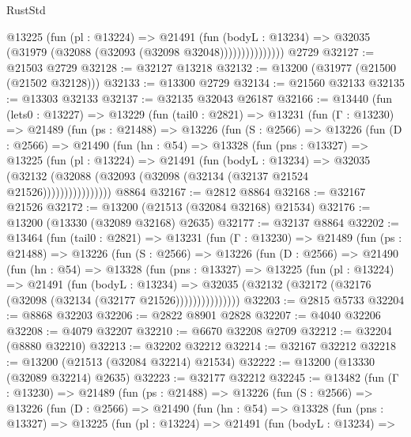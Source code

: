 \begin{lexlean}{RustStd}
\begin{coremodule}
                    @13225
                      (fun (pl : @13224) =>
                      @21491
                        (fun (bodyL : @13234) =>
                        @32035 (@31979 (@32088 (@32093 (@32098 @32048)))))))))))))))
    @2729
@32127 := @21503 @2729
@32128 := @32127 @13218
@32132 := @13200 (@31977 (@21500 (@21502 @32128)))
@32133 := @13300 @2729
@32134 := @21560 @32133
@32135 := @13303 @32133
@32137 := @32135 @32043 @26187
@32166 := @13440
    (fun (lets0 : @13227) =>
    @13229
      (fun (tail0 : @2821) =>
      @13231
        (fun (Γ : @13230) =>
        @21489
          (fun (ps : @21488) =>
          @13226
            (fun (S : @2566) =>
            @13226
              (fun (D : @2566) =>
              @21490
                (fun (hn : @54) =>
                @13328
                  (fun (pns : @13327) =>
                  @13225
                    (fun (pl : @13224) =>
                    @21491
                      (fun (bodyL : @13234) =>
                      @32035
                        (@32132
                          (@32088 (@32093 (@32098 (@32134 (@32137 @21524 @21526))))))))))))))))
    @8864
@32167 := @2812 @8864
@32168 := @32167 @21526
@32172 := @13200 (@21513 (@32084 @32168) @21534)
@32176 := @13200 (@13330 (@32089 @32168) @2635)
@32177 := @32137 @8864
@32202 := @13464
    (fun (tail0 : @2821) =>
    @13231
      (fun (Γ : @13230) =>
      @21489
        (fun (ps : @21488) =>
        @13226
          (fun (S : @2566) =>
          @13226
            (fun (D : @2566) =>
            @21490
              (fun (hn : @54) =>
              @13328
                (fun (pns : @13327) =>
                @13225
                  (fun (pl : @13224) =>
                  @21491
                    (fun (bodyL : @13234) =>
                    @32035 (@32132 (@32172 (@32176 (@32098 (@32134 (@32177 @21526)))))))))))))))
@32203 := @2815 @5733
@32204 := @8868 @32203
@32206 := @2822 @8901 @2828
@32207 := @4040 @32206
@32208 := @4079 @32207
@32210 := @6670 @32208 @2709
@32212 := @32204 (@8880 @32210)
@32213 := @32202 @32212
@32214 := @32167 @32212
@32218 := @13200 (@21513 (@32084 @32214) @21534)
@32222 := @13200 (@13330 (@32089 @32214) @2635)
@32223 := @32177 @32212
@32245 := @13482
    (fun (Γ : @13230) =>
    @21489
      (fun (ps : @21488) =>
      @13226
        (fun (S : @2566) =>
        @13226
          (fun (D : @2566) =>
          @21490
            (fun (hn : @54) =>
            @13328
              (fun (pns : @13327) =>
              @13225
                (fun (pl : @13224) =>
                @21491
                  (fun (bodyL : @13234) =>

\end{coremodule}
\end{lexlean}
